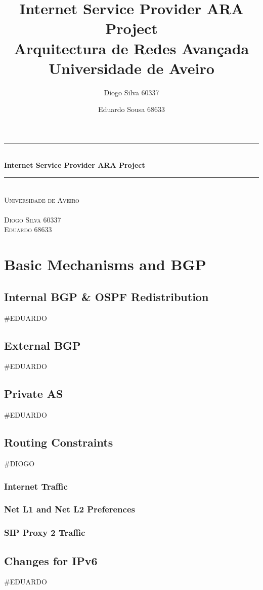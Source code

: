 \documentclass[11pt,a4paper]{report}
\title{\textbf{Internet Service Provider ARA Project} \\Arquitectura de Redes Avançada \\Universidade de Aveiro}
\author{Diogo Silva 60337 \and Eduardo Sousa 68633 }
\newcommand{\HRule}{\rule{\linewidth}{0.5mm}}
\begin{document}
\begin{titlepage}
\begin{center}
\HRule \\[0.4cm]
{ \huge \bfseries Internet Service Provider ARA Project \\[0.4cm] }
\HRule \\[1.5cm]
\textsc{\LARGE Universidade de Aveiro}\\[1.5cm]
\textsc{}\\[1.5cm]
\textsc{Diogo Silva 60337 \\Eduardo 68633 }
\end{center}
\end{titlepage}
\maketitle
\tableofcontents

\chapter{Basic Mechanisms and BGP}

\section{Internal BGP \& OSPF Redistribution}
\#EDUARDO
\section{External BGP}
\#EDUARDO
\section{Private AS}
\#EDUARDO

\section{Routing Constraints}
\#DIOGO
\subsection{Internet Traffic}
\subsection{Net L1 and Net L2 Preferences}
\subsection{SIP Proxy 2 Traffic}
\section{Changes for IPv6}
\#EDUARDO
\end{document}
